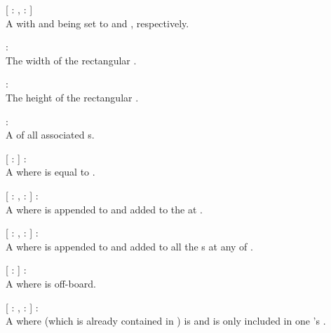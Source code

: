 \begin{dlist}
  \item {}[  : ,  :  ]\\
  A  with  and  being set to
   and , respectively.
  
  \item {} : \\
  The width of the rectangular .
  
  \item {} : \\
  The height of the rectangular .
  
  \item {} : \\
  A  of all associated s.
  
  \item {}[  :  ] : \\
  A  where  is equal to .
  
  \item {}[  : ,  :  ] : \\
  A  where  is appended to  and
  added to the  at .
  
  \item {}[  : ,  :  ] : \\
  A  where  is appended to  and
  added to all the s at any of .
  
  \item {}[  :  ] : \\
  A  where  is off-board.
  
  \item {}[  : ,  :  ] : \\
  A  where  (which is already contained in
  ) is  and is only included in one
  's .
  

\end{dlist}
